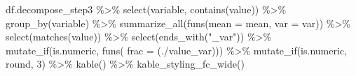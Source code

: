 \documentclass[
]{book}
\newenvironment{Shaded}{\begin{snugshade}}{\end{snugshade}}
\newcommand{\AttributeTok}[1]{\textcolor[rgb]{0.77,0.63,0.00}{#1}}
\newcommand{\DecValTok}[1]{\textcolor[rgb]{0.00,0.00,0.81}{#1}}
\newcommand{\FunctionTok}[1]{\textcolor[rgb]{0.00,0.00,0.00}{#1}}
\newcommand{\NormalTok}[1]{#1}
\newcommand{\SpecialCharTok}[1]{\textcolor[rgb]{0.00,0.00,0.00}{#1}}
\newcommand{\StringTok}[1]{\textcolor[rgb]{0.31,0.60,0.02}{#1}}
\begin{document}
\begin{Shaded}
\begin{Highlighting}[]
\NormalTok{df.decompose\_step3 }\SpecialCharTok{\%\textgreater{}\%}
        \FunctionTok{select}\NormalTok{(variable, }\FunctionTok{contains}\NormalTok{(}\StringTok{\textquotesingle{}value\textquotesingle{}}\NormalTok{)) }\SpecialCharTok{\%\textgreater{}\%}
        \FunctionTok{group\_by}\NormalTok{(variable) }\SpecialCharTok{\%\textgreater{}\%}
        \FunctionTok{summarize\_all}\NormalTok{(}\FunctionTok{funs}\NormalTok{(}\AttributeTok{mean =}\NormalTok{ mean, }\AttributeTok{var =}\NormalTok{ var)) }\SpecialCharTok{\%\textgreater{}\%}
        \FunctionTok{select}\NormalTok{(}\FunctionTok{matches}\NormalTok{(}\StringTok{\textquotesingle{}value\textquotesingle{}}\NormalTok{)) }\SpecialCharTok{\%\textgreater{}\%} \FunctionTok{select}\NormalTok{(}\FunctionTok{ends\_with}\NormalTok{(}\StringTok{"\_var"}\NormalTok{)) }\SpecialCharTok{\%\textgreater{}\%}
        \FunctionTok{mutate\_if}\NormalTok{(is.numeric, }\FunctionTok{funs}\NormalTok{( }\AttributeTok{frac =}\NormalTok{ (.}\SpecialCharTok{/}\NormalTok{value\_var))) }\SpecialCharTok{\%\textgreater{}\%}
        \FunctionTok{mutate\_if}\NormalTok{(is.numeric, round, }\DecValTok{3}\NormalTok{) }\SpecialCharTok{\%\textgreater{}\%}
  \FunctionTok{kable}\NormalTok{() }\SpecialCharTok{\%\textgreater{}\%}
  \FunctionTok{kable\_styling\_fc\_wide}\NormalTok{()}
\end{Highlighting}
\end{Shaded}

\begin{table}[!h]
\centering
{}
\end{table}
\end{document}
